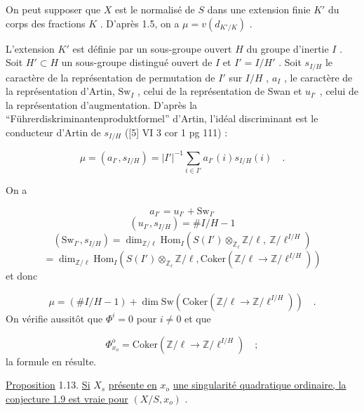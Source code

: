 On peut supposer que $X$ est le normalisé de $S$ dans une extension finie $K'$ du corps des fractions $K$ . D'après 1.5, on a $\mu = v(d_{K'/K})$ .

L'extension $K'$ est définie par un sous-groupe ouvert $H$ du groupe d'inertie $I$ . Soit $H' \subset H$ un sous-groupe distingué ouvert de $I$ et $I' = I/H'$ . Soit $s_{I/H}$ le caractère de la représentation de permutation de $I'$ sur $I/H$ , $a_I$ , le caractère de la représentation d'Artin, $\mathrm{Sw}_I$ , celui de la représentation de Swan et $u_{I'}$ , celui de la représentation d'augmentation. D'après la ``Führerdiskriminantenproduktformel'' d'Artin, l'idéal discriminant est le conducteur d'Artin de $s_{I/H}$ ([5] VI 3 cor 1 pg 111) :

\begin{equation*}
\mu = (a_{I'},s_{I/H}) = |I'|^{-1} \sum_{i \in I'} a_{I'}(i)s_{I/H}(i) \quad .
\end{equation*}


On a

\begin{equation*}
a_{I'} = u_{I'} + \mathrm{Sw}_{I'}
\end{equation*}
\begin{equation*}
(u_{I'},s_{I/H}) = \# I/H - 1
\end{equation*}
\begin{equation*}
(\mathrm{Sw}_{I'},s_{I/H}) = \dim_{\mathbb{Z}/\ell} \mathrm{Hom}_I(S(I') \otimes_{\mathbb{Z}_\ell} \mathbb{Z}/\ell, \ \mathbb{Z}/\ell^{I/H})
\end{equation*}
\begin{equation*}
= \dim_{\mathbb{Z}/\ell} \mathrm{Hom}_I(S(I') \otimes_{\mathbb{Z}_\ell} \mathbb{Z}/\ell, \mathrm{Coker}( \mathbb{Z}/\ell \to \mathbb{Z}/\ell^{I/H}))
\end{equation*}
et donc

\begin{equation*}
\mu = (\# I/H - 1) + \dim \mathrm{Sw} (\mathrm{Coker}( \mathbb{Z}/\ell \to \mathbb{Z}/\ell^{I/H})) \quad .
\end{equation*}
On vérifie aussitôt que $\Phi^i = 0$ pour $i \neq 0$ et que

\begin{equation*}
\Phi^o_{x_o} = \mathrm{Coker}( \mathbb{Z}/\ell \to \mathbb{Z}/\ell^{I/H}) \quad ;
\end{equation*}
la formule en résulte.

\underline{Proposition} 1.13. \underline{Si} $X_s$ \underline{présente en} $x_o$ \underline{une singularité quadratique ordinaire, la conjecture 1.9 est vraie pour} $(X/S,x_o)$ .

